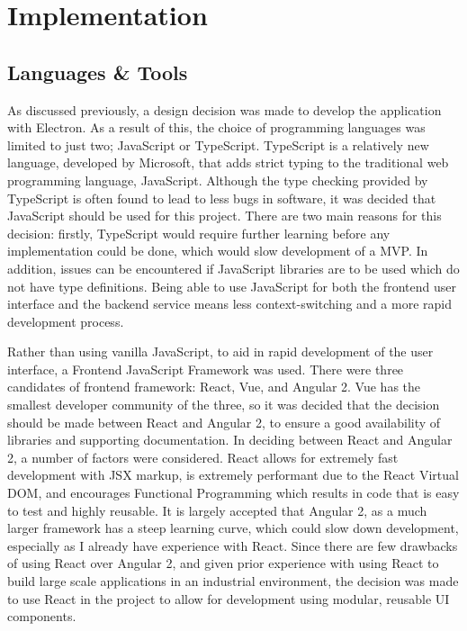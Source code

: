 \chapter{Implementation}


\section{Languages \& Tools}\label{sec:languages-tools}
As discussed previously, a design decision was made to develop the application with Electron. As a result of this, the choice of programming languages was limited to just two; JavaScript or TypeScript. TypeScript is a relatively new language, developed by Microsoft, that adds strict typing to the traditional web programming language, JavaScript. Although the type checking provided by TypeScript is often found to lead to less bugs in software, it was decided that JavaScript should be used for this project. There are two main reasons for this decision: firstly, TypeScript would require further learning before any implementation could be done, which would slow development of a MVP. In addition, issues can be encountered if JavaScript libraries are to be used which do not have type definitions. Being able to use JavaScript for both the frontend user interface and the backend service means less context-switching and a more rapid development process.

Rather than using vanilla JavaScript, to aid in rapid development of the user interface, a Frontend JavaScript Framework was used.  There were three candidates of frontend framework: React, Vue, and Angular 2. Vue has the smallest developer community of the three, so it was decided that the decision should be made between React and Angular 2, to ensure a good availability of libraries and supporting documentation. In deciding between React and Angular 2, a number of factors were considered. React allows for extremely fast development with JSX markup, is extremely performant due to the React Virtual DOM, and encourages Functional Programming which results in code that is easy to test and highly reusable. It is largely accepted that Angular 2, as a much larger framework has a steep learning curve, which could slow down development, especially as I already have experience with React. Since there are few drawbacks of using React over Angular 2, and given prior experience with using React to build large scale applications in an industrial environment, the decision was made to use React in the project to allow for development using modular, reusable UI components.

